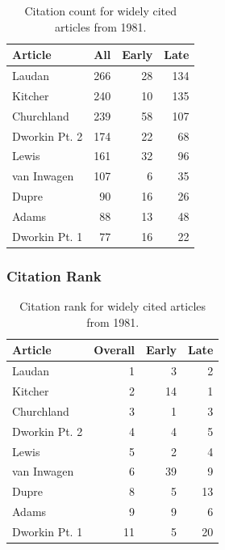 \documentclass[
  10pt,
  letterpaper,
  DIV=11,
  numbers=noendperiod,
  twoside]{scrartcl}
\begin{document}
\begin{longtable}[]{@{}lrrr@{}}

\caption{\label{tbl-citation-count-1981}Citation count for widely cited
articles from 1981.}

\tabularnewline

\toprule\noalign{}
Article & All & Early & Late \\
\midrule\noalign{}
\endhead
\bottomrule\noalign{}
\endlastfoot
Laudan & 266 & 28 & 134 \\
Kitcher & 240 & 10 & 135 \\
Churchland & 239 & 58 & 107 \\
Dworkin Pt. 2 & 174 & 22 & 68 \\
Lewis & 161 & 32 & 96 \\
van Inwagen & 107 & 6 & 35 \\
Dupre & 90 & 16 & 26 \\
Adams & 88 & 13 & 48 \\
Dworkin Pt. 1 & 77 & 16 & 22 \\

\end{longtable}

\subsubsection*{Citation Rank}\label{citation-rank-5}

\begin{longtable}[]{@{}lrrr@{}}

\caption{\label{tbl-citation-rank-1981}Citation rank for widely cited
articles from 1981.}

\tabularnewline

\toprule\noalign{}
Article & Overall & Early & Late \\
\midrule\noalign{}
\endhead
\bottomrule\noalign{}
\endlastfoot
Laudan & 1 & 3 & 2 \\
Kitcher & 2 & 14 & 1 \\
Churchland & 3 & 1 & 3 \\
Dworkin Pt. 2 & 4 & 4 & 5 \\
Lewis & 5 & 2 & 4 \\
van Inwagen & 6 & 39 & 9 \\
Dupre & 8 & 5 & 13 \\
Adams & 9 & 9 & 6 \\
Dworkin Pt. 1 & 11 & 5 & 20 \\

\end{longtable}
\end{document}
